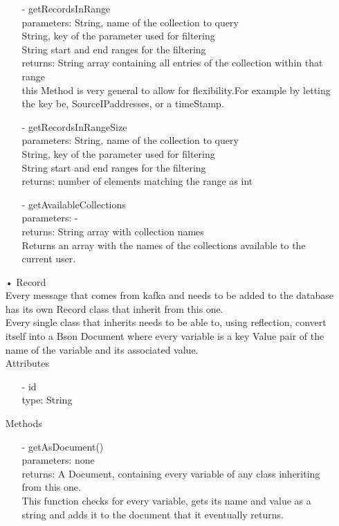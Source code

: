 \documentclass[oneside, english, final]{design}
\begin{document}
\begin{itemize}
\begin{itemize}
		      \item[-]getRecordsInRange
		            \\parameters: String, name of the collection to query
		            \\String, key of the parameter used for filtering
		            \\String start and end ranges for the filtering
		            \\returns: String array containing all entries of the collection within that range
		            \\this Method is very general to allow for flexibility.For example by letting the key be, SourceIPaddresses, or a timeStamp.

		      \item[-]getRecordsInRangeSize
		            \\parameters: String, name of the collection to query
		            \\String, key of the parameter used for filtering
		            \\String start and end ranges for the filtering
		            \\returns: number of elements matching the range as int
		      \item[-]getAvailableCollections
		            \\parameters: -
		            \\returns: String array with collection names
		            \\Returns an array with the names of the collections available to the current user.


	      \end{itemize}

	\item[•]Record
	      \\Every message that comes from kafka and needs to be added to the database has its own Record class that inherit from this one.
	      \\Every single class that inherits needs to be able to, using reflection, convert itself into a Bson Document where every variable is a key Value pair of the name of the variable and its associated value.
	      \\Attributes
	      \begin{itemize}
		      \item[-] id
		            \\type: String
	      \end{itemize}
	      Methods
	      \begin{itemize}
		      \item[-]getAsDocument()
		            \\parameters: none
		            \\returns: A Document, containing every variable of any class inheriting from this one.
		            \\This function checks for every variable, gets its name and value as a string and adds it to the document that it eventually returns.
	      \end{itemize}


\end{itemize}
\end{document}
